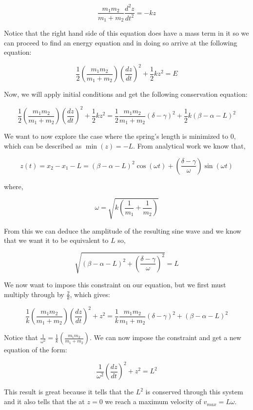 \documentclass[11pt, oneside]{article}   	%
\begin{document}
$$\frac{m_1m_2}{m_1+m_2}\frac{d^2z}{dt^2}=-kz$$

Notice that the right hand side of this equation does have a mass term in it so we can proceed to find an energy equation and in doing so arrive at the following equation:

$$\frac{1}{2}\left(\frac{m_1m_2}{m_1+m_2}\right)\left(\frac{dz}{dt}\right)^2 +\frac{1}{2}kz^2=E$$

Now, we will apply initial conditions and get the following conservation equation:

$$\frac{1}{2}\left(\frac{m_1m_2}{m_1+m_2}\right)\left(\frac{dz}{dt}\right)^2 +\frac{1}{2}kz^2=\frac{1}{2}\frac{m_1m_2}{m_1+m_2}\left(\delta -\gamma\right)^2+\frac{1}{2}k\left(\beta -\alpha -L\right)^2$$

We want to now explore the case where the spring's length is minimized to 0, which can be described as $\min(z)=-L$.
From analytical work we know that,

$$\displaystyle{z(t)=x_2-x_1-L=(\beta -\alpha -L)^2\cos{(\omega t)}+\left(\frac{\delta -\gamma}{\omega}\right)\sin{(\omega t)}}$$

where, 

$$\displaystyle{\omega = \sqrt{k\left(\frac{1}{m_1}+\frac{1}{m_2}\right)}}$$

From this we can deduce the amplitude of the resulting sine wave and we know that we want it to be equivalent to $L$ so,

$$\sqrt{(\beta -\alpha -L)^2+\left(\frac{\delta - \gamma}{\omega}\right)^2}=L$$

We now want to impose this constraint on our equation, but we first must multiply through by $\frac{2}{k}$, which gives:

$$\frac{1}{k}\left(\frac{m_1m_2}{m_1+m_2}\right)\left(\frac{dz}{dt}\right)^2 +z^2=\frac{1}{k}\frac{m_1m_2}{m_1+m_2}\left(\delta -\gamma\right)^2+\left(\beta -\alpha -L\right)^2$$

Notice that $\displaystyle{\frac{1}{\omega^2}}=\frac{1}{k}\left(\frac{m_1m_2}{m_1+m_2}\right)$. We can now impose the constraint and get a new equation of the form:

$$\frac{1}{\omega^2}\left(\frac{dz}{dt}\right)^2+z^2=L^2$$

This result is great because it tells that the $L^2$ is conserved through this system and it also tells that the at $z=0$ we reach a maximum velocity of $v_{max}=L\omega$.
\newpage
\end{document}
